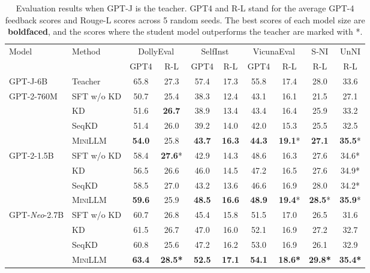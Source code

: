 \documentclass{article}
\begin{document}
\begin{table}[t]
    \centering
    \small
    \begin{tabular}{ll|cc|cc|cc|c|c}
    \toprule
    \multirow{2}{*}{Model} & \multirow{2}{*}{Method}
    & \multicolumn{2}{c|}{DollyEval} & \multicolumn{2}{c|}{SelfInst} & \multicolumn{2}{c|}{VicunaEval} & S-NI & UnNI\\
     & & GPT4 & R-L & GPT4 & R-L  & GPT4 & R-L & R-L & R-L \\ \midrule
     GPT-J-6B & Teacher &  65.8  &  27.3 &  57.4 &   17.3 &  55.8 & 17.4 & 28.0 & 33.6    \\ \cmidrule(l){1-10}
     \multirow{4}{*}{GPT-2-760M} 
        & SFT w/o KD     &  50.7  & 25.4 &  38.3 &   12.4 &  43.1 & 16.1 & 21.5 & 27.1     \\
     & KD &  51.6  &  \textbf{26.7} &  38.9 &   13.4 &  43.4 & 16.4 & 25.9 & 33.2     \\
     & SeqKD  &  51.4  &  26.0 &  39.2 &   14.0 &  42.0 & 15.3 & 25.5 & 32.5     \\
     & \textsc{MiniLLM}  &  \textbf{54.0}  &  25.8 &  \textbf{43.7} &   \textbf{16.3} &  \textbf{44.3} & \textbf{19.1}* & \textbf{27.1} & \textbf{35.5}*     \\ \cmidrule(l){1-10}
     \multirow{4}{*}{GPT-2-1.5B} 
        & SFT w/o KD     &  58.4  &  \textbf{27.6}* &  42.9  &  14.3         &  48.6       & 16.3    &  27.6 & 34.6*    \\
     & KD &  56.5  &  26.6 &  46.0 &  14.5  &  47.2       & 16.5    &  27.6 & 34.9*  \\
     & SeqKD  &  58.5  &  27.0 &  43.2 &  13.6  &  46.6 & 16.9 & 28.0 & 34.2*     \\
     & \textsc{MiniLLM}  &  \textbf{59.6}  &  25.9        &  \textbf{48.5}       &  \textbf{16.6}         &  \textbf{48.9}       & \textbf{19.4}*    &  \textbf{28.5}* & \textbf{35.9}*  \\ \cmidrule(l){1-10}
     \multirow{4}{*}{GPT-\textit{Neo}-2.7B} 
        & SFT w/o KD     &  60.7  &  26.8 &  45.4 &   15.8 &  51.5 & 17.0 & 26.5 & 31.6   \\ 
     & KD &  61.5  &  26.7 &  47.0 &   16.0 &  52.1 & 16.9 & 27.2 & 32.7   \\
     & SeqKD  &  60.8  &  25.6 &  47.2 &   16.2 &  53.0 & 16.9 & 26.1 & 32.9    \\
     & \textsc{MiniLLM}  &  \textbf{63.4}  &  \textbf{28.5*} &  \textbf{52.5} &   \textbf{17.1} &  \textbf{54.1} & \textbf{18.6*} & \textbf{29.8*} & \textbf{35.4*}    \\ 
     \bottomrule
    \end{tabular}
    \vspace{0.4cm}
    \caption{Evaluation results when GPT-J is the teacher. GPT4 and R-L stand for the average GPT-4 feedback scores and Rouge-L scores across 5 random seeds. The best scores of each model size are \textbf{boldfaced}, and the scores where the student model outperforms the teacher are marked with *.}
    \label{tab:auto_gptj}
\end{table}
\end{document}
